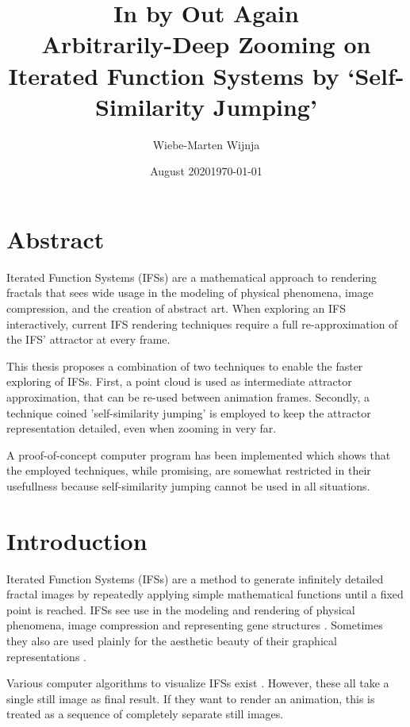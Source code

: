\documentclass[11pt]{article}
\date{August 2020}
\author{Wiebe-Marten Wijnja}
\date{\today}
\title{\Huge In by Out Again\\\medskip
\large Arbitrarily-Deep Zooming on Iterated Function Systems by `Self-Similarity Jumping'}
\begin{document}
\maketitle
\setcounter{tocdepth}{4}
\tableofcontents

\pagebreak

\section*{Abstract}
\label{sec:org04c15a0}
Iterated Function Systems (IFSs) are a mathematical approach to rendering fractals that sees wide usage in the modeling of physical phenomena, 
image compression, and the creation of abstract art.
When exploring an IFS interactively, current IFS rendering techniques require a full re-approximation of the IFS' attractor at every frame.

This thesis proposes a combination of two techniques to enable the faster exploring of IFSs.
First, a point cloud is used as intermediate attractor approximation, that can be re-used between animation frames.
Secondly, a technique coined 'self-similarity jumping' is employed to keep the attractor representation detailed, even when zooming in very far.

A proof-of-concept computer program has been implemented
which shows that the employed techniques, while promising, 
are somewhat restricted in their usefullness because self-similarity jumping cannot be used in all situations.

\section{Introduction}
\label{sec:org75d2474}

Iterated Function Systems (IFSs) are a method to generate infinitely detailed fractal images 
by repeatedly applying simple mathematical functions until a fixed point is reached. \cite{barnsley1988fractals}
IFSs see use in the modeling and rendering of physical phenomena, image compression \cite{hart1996fractal} and representing gene structures \cite{jeffrey1990chaos}.
Sometimes they also are used plainly for the aesthetic beauty of their graphical representations \cite{draves2003fractal}.

Various computer algorithms to visualize IFSs exist \cite{hepting1991rendering}.
However, these all take a single still image as final result. If they want to render an animation,
this is treated as a sequence of completely separate still images.
\end{document}
